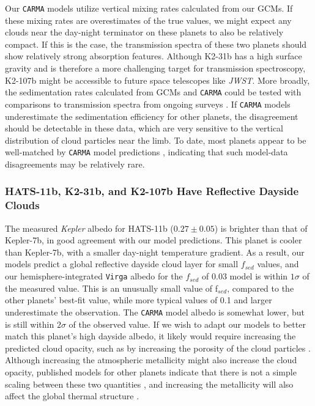 \documentclass[twocolumn]{aastex63}
\begin{document}
Our \texttt{CARMA} models utilize vertical mixing rates calculated from our GCMs.  If these mixing rates are overestimates of the true values, we might expect any clouds near the day-night terminator on these planets to also be relatively compact.  If this is the case, the transmission spectra of these two planets should show relatively strong absorption features.  Although K2-31b has a high surface gravity and is therefore a more challenging target for transmission spectroscopy, K2-107b might be accessible to future space telescopes like \emph{JWST}.  More broadly, the sedimentation rates calculated from GCMs and \texttt{CARMA} could be tested with comparisons to transmission spectra from ongoing surveys \citep[][]{sing2016,crossfield2017,fu2017}. If \texttt{CARMA} models underestimate the sedimentation efficiency for other planets, the disagreement should be detectable in these data, which are very sensitive to the vertical distribution of cloud particles near the limb. To date, most planets appear to be well-matched by \texttt{CARMA} model predictions \citep[e.g.][]{chachan2020,gao2020}, indicating that such model-data disagreements may be relatively rare. 

\subsubsection{HATS-11b, K2-31b, and K2-107b Have Reflective Dayside Clouds}\label{hats}

The measured \emph{Kepler} albedo for HATS-11b ($0.27\pm0.05$) is brighter than that of Kepler-7b, in good agreement with our model predictions.  This planet is cooler than Kepler-7b, with a smaller day-night temperature gradient.  As a result, our models predict a global reflective dayside cloud layer for small $f_{sed}$ values, and our hemisphere-integrated \texttt{Virga} albedo for the $f_{sed}$ of 0.03 model is within $1\sigma$ of the measured value. This is an unusually small value of f$_{sed}$, compared to the other planets' best-fit value, while more typical values of 0.1 and larger underestimate the observation. The \texttt{CARMA} model albedo is somewhat lower, but is still within $2\sigma$ of the observed value. If we wish to adapt our models to better match this planet's high dayside albedo, it likely would require increasing the predicted cloud opacity, such as by increasing the porosity of the cloud particles \citep{samra2020}.  Although increasing the atmospheric metallicity might also increase the cloud opacity, published models for other planets indicate that there is not a simple scaling between these two quantities \citep[e.g.][]{morley2013,gao2018}, and increasing the metallicity will also affect the global thermal structure \citep[e.g.][]{kataria2015}. 
\end{document}
